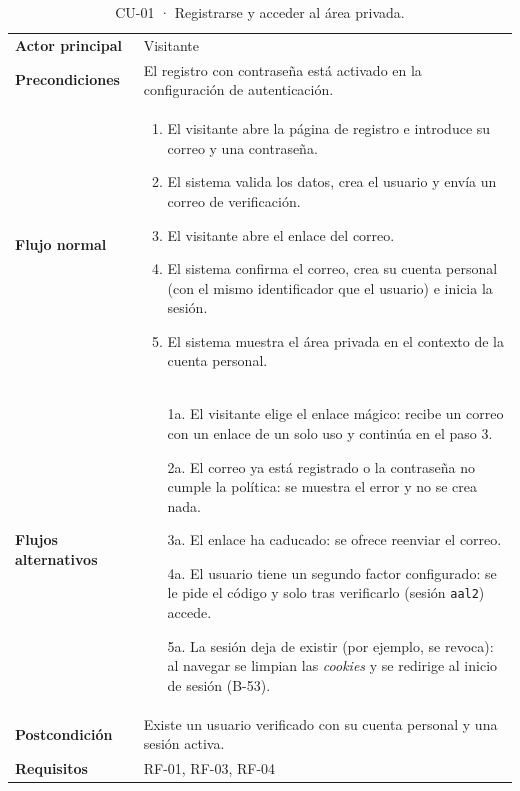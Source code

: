 {\footnotesize
\begin{xltabular}{\textwidth}{@{}>{\bfseries}p{2.6cm}X@{}}
  \caption{CU-01 · Registrarse y acceder al área privada.}\label{tab:ana-cu01}\\
    \toprule
    Actor principal & Visitante \\
    Precondiciones & El registro con contraseña está activado en la configuración de autenticación. \\
    \midrule
    Flujo normal &
      \begin{enumerate}[nosep,leftmargin=*]
        \item El visitante abre la página de registro e introduce su correo y una contraseña.
        \item El sistema valida los datos, crea el usuario y envía un correo de verificación.
        \item El visitante abre el enlace del correo.
        \item El sistema confirma el correo, crea su cuenta personal (con el mismo identificador que el usuario) e inicia la sesión.
        \item El sistema muestra el área privada en el contexto de la cuenta personal.
      \end{enumerate} \\
    \midrule
    Flujos alternativos &
      \begin{itemize}[nosep,leftmargin=*]
        \item[1a.] El visitante elige el enlace mágico: recibe un correo con un enlace de un solo uso y continúa en el paso 3.
        \item[2a.] El correo ya está registrado o la contraseña no cumple la política: se muestra el error y no se crea nada.
        \item[3a.] El enlace ha caducado: se ofrece reenviar el correo.
        \item[4a.] El usuario tiene un segundo factor configurado: se le pide el código y solo tras verificarlo (sesión \texttt{aal2}) accede.
        \item[5a.] La sesión deja de existir (por ejemplo, se revoca): al navegar se limpian las \textit{cookies} y se redirige al inicio de sesión (B-53).
      \end{itemize} \\
    \midrule
    Postcondición & Existe un usuario verificado con su cuenta personal y una sesión activa. \\
    Requisitos & RF-01, RF-03, RF-04 \\
    \bottomrule
\end{xltabular}}

